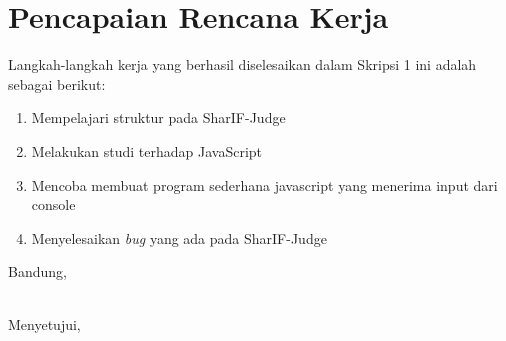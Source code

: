\documentclass[a4paper,twoside]{article}
\begin{document}
\section{Pencapaian Rencana Kerja}
Langkah-langkah kerja yang berhasil diselesaikan dalam Skripsi 1 ini adalah sebagai berikut:
\begin{enumerate}
\item Mempelajari struktur pada  SharIF-Judge
\item Melakukan studi terhadap JavaScript
\item Mencoba membuat program sederhana javascript yang menerima input dari console
\item Menyelesaikan \textit{bug} yang ada pada SharIF-Judge 
\end{enumerate}


\vspace{1cm}
\centering Bandung, \tanggal\\
\vspace{2cm} \nama \\ 
\vspace{1cm}

Menyetujui, \\
\end{document}
